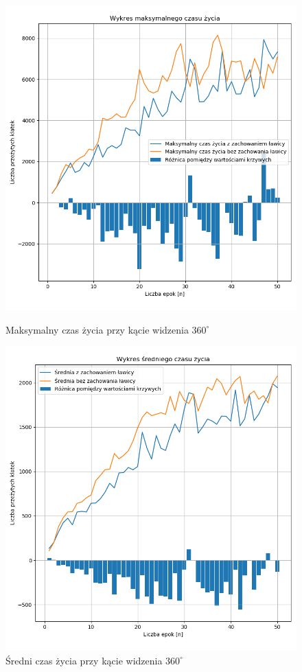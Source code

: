 \documentclass{article}
\begin{document}
\begin{figure}[H]
    \begin{minipage}{0.48\textwidth}
        \centering
        \includegraphics[width=\textwidth]{maximum_lifetime.png}
        \caption{Maksymalny czas życia przy kącie widzenia \(360^{\circ}\)} 
    \end{minipage}
    \hspace{0.02\textwidth}
    \begin{minipage}{0.48\textwidth}
        \centering
        \includegraphics[width=\textwidth]{average_lifetime.png}
        \caption{Średni czas życia przy kącie widzenia \(360^{\circ}\)}
    \end{minipage}
\end{figure}
\end{document}
